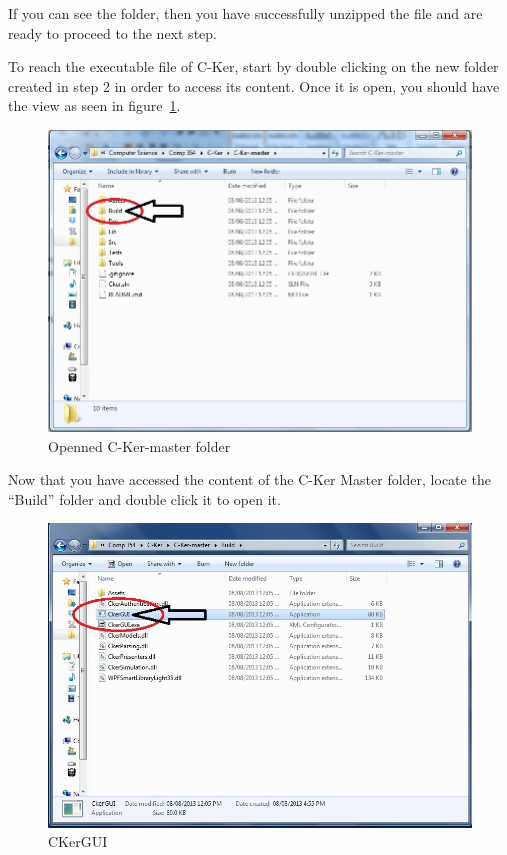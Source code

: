 \documentclass[12pt]{article}
\begin{document}
\clearpage

If you can see the folder, then you have successfully unzipped the file and are ready to proceed to the next step.\par



\vspace*{0.2in}
\vspace*{0.2in}
To reach the executable file of C-Ker, start by double clicking on the new folder created in step 2 in order to access its content. Once it is open, you should have the view as seen in figure~\ref{fig:Openned C-Ker-master folder}.
\begin{figure}[h!]
    \centering
    \includegraphics[scale=1]{insta7}
    \caption{Openned C-Ker-master folder}
    \label{fig:Openned C-Ker-master folder}
\end{figure}\par

Now that you have accessed the content of the C-Ker Master folder, locate the “Build” folder and double click it to open it.
\begin{figure}[h!]
    \centering
    \includegraphics[scale=1]{insta8}
    \caption{CKerGUI}
    \label{fig:CKerGUI}
\end{figure}\par
\end{document}
